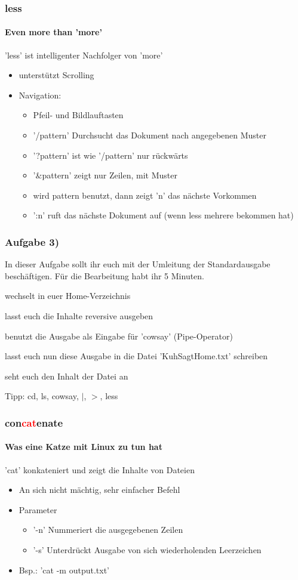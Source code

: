 \documentclass[12pt,utf8, handout]{beamer}
\begin{document}
\begin{frame}
\frametitle{less}
\framesubtitle{\textcolor{ownDarkOr}{Even more than 'more'}}
'less' ist intelligenter Nachfolger von 'more'
\begin{itemize}
	\item unterstützt Scrolling
	\item Navigation:
	\begin{itemize}[<+->]
		\item Pfeil- und Bildlauftasten
		\item '/pattern' Durchsucht das Dokument nach angegebenen Muster
		\item '?pattern' ist wie '/pattern' nur rückwärts
		\item '$\&$pattern' zeigt nur Zeilen, mit Muster
		\item wird pattern benutzt, dann zeigt 'n' das nächste Vorkommen
		\item ':n' ruft das nächste Dokument auf (wenn less mehrere bekommen hat)
	\end{itemize}
\end{itemize}
\end{frame}

\begin{frame}
\frametitle{Aufgabe 3)}
In dieser Aufgabe sollt ihr euch mit der Umleitung der Standardausgabe beschäftigen. Für die Bearbeitung habt ihr 5 Minuten.
\begin{itemize}
	{\footnotesize
	\item wechselt in euer Home-Verzeichnis
	\item lasst euch die Inhalte reversive ausgeben
	\item benutzt die Ausgabe als Eingabe für 'cowsay' (Pipe-Operator)
	\item lasst euch nun diese Ausgabe in die Datei 'KuhSagtHome.txt' schreiben
	\item seht euch den Inhalt der Datei an
	}
\end{itemize}
{\scriptsize Tipp: cd, ls, cowsay, $\mid$, $>$, less}
\end{frame}

\begin{frame}
\frametitle{con\textcolor{red}{cat}enate}
\framesubtitle{\textcolor{ownDarkOr}{Was eine Katze mit Linux zu tun hat}}
'cat' konkateniert und zeigt die Inhalte von Dateien
\begin{itemize}[<+->]
	\item An sich nicht mächtig, sehr einfacher Befehl
	\item Parameter
	\begin{itemize}
		\item '-n' Nummeriert die ausgegebenen Zeilen 
		\item '-s' Unterdrückt Ausgabe von sich wiederholenden Leerzeichen
	\end{itemize}
	\item Bsp.: 'cat -m output.txt'
\end{itemize}
\end{frame}
\end{document}
